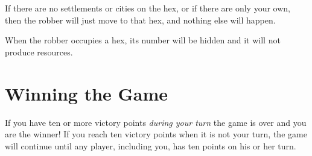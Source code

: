 \documentclass[12pt,letterpaper,titlepage]{article}
\begin{document}
	If there are no settlements or cities on the hex, or if there are only your own, then the robber will just move to that hex, and nothing else will happen.
	
	When the robber occupies a hex, its number will be hidden and it will not produce resources.

\section{Winning the Game}
If you have ten or more victory points \emph{during your turn} the game is over and you are the winner! If you reach ten victory points when it is not your turn, the game will continue until any player, including you, has ten points on his or her turn.
\end{document}
